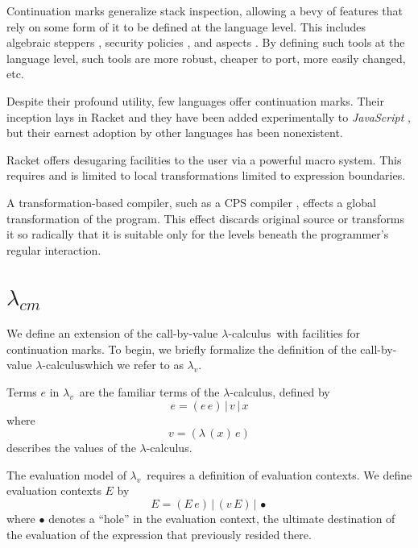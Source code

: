 \documentclass{llncs}
\newcommand{\cm}[0]{$\lambda_{cm}$}
\newcommand{\lv}[0]{$\lambda_v$}
\newcommand{\lc}[0]{$\lambda$-calculus}
\newcommand{\app}[2]{(#1\,#2)}
\newcommand{\abs}[2]{(\lambda\,(#1)\,#2)}
\newcommand{\hole}[0]{\bullet}
\begin{document}
Continuation marks generalize stack inspection, allowing a bevy of features that rely on some form of it to be defined at the language level. This includes algebraic steppers \cite{clements2001modeling}, security policies \cite{clements2004tail}, and aspects \cite{tucker2003pointcuts}. By defining such tools at the language level, such tools are more robust, cheaper to port, more easily changed, etc.

Despite their profound utility, few languages offer continuation marks. Their inception lays in Racket \cite{plt-tr1} and they have been added experimentally to \emph{JavaScript} \cite{clements2008implementing}, but their earnest adoption by other languages has been nonexistent.



Racket offers desugaring facilities to the user via a powerful macro system. This requires and is limited to local transformations limited to expression boundaries.

A transformation-based compiler, such as a CPS compiler \cite{appel2007compiling}, effects a global transformation of the program. This effect discards original source or transforms it so radically that it is suitable only for the levels beneath the programmer's regular interaction.

\section{\cm}

We define an extension of the call-by-value \lc\ with facilities for continuation marks. To begin, we briefly formalize the definition of the call-by-value \lc which we refer to as \lv.

Terms $e$ in \lv\ are the familiar terms of the \lc, defined by
\begin{equation}
e=\app{e}{e}\,|\,v\,|\,x
\end{equation}
where 
\begin{equation}
v=\abs{x}{e}
\end{equation}
describes the values of the \lc.

The evaluation model of \lv\ requires a definition of evaluation contexts. We define evaluation contexts $E$ by
\begin{equation}
E=\app{E}{e}\,|\,\app{v}{E}\,|\,\hole
\end{equation}
where $\hole$ denotes a ``hole'' in the evaluation context, the ultimate destination of the evaluation of the expression that previously resided there.
\end{document}
